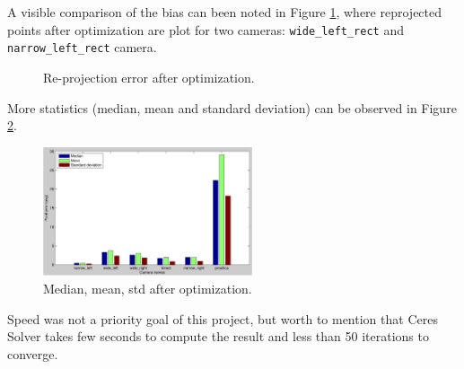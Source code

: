 A visible comparison of the bias can been noted in Figure \ref{fig:reprojection}, where reprojected points after optimization are plot for two cameras: \texttt{wide\_left\_rect} and \texttt{narrow\_left\_rect} camera.
\begin{figure}[!htbp]
  \centering
  \caption{Re-projection error after optimization.}
  \label{fig:reprojection}
\end{figure}



More statistics (median, mean and standard deviation) can be observed in Figure \ref{fig:stats}.
\begin{figure}[!htbp]
 \centering
 \includegraphics[width=0.55\textwidth]{images/stats.pdf}
 \caption{Median, mean, std after optimization.}
 \label{fig:stats}
\end{figure}


Speed was not a priority goal of this project, but worth to mention that Ceres Solver takes few seconds to compute the result and less than 50 iterations to converge.


